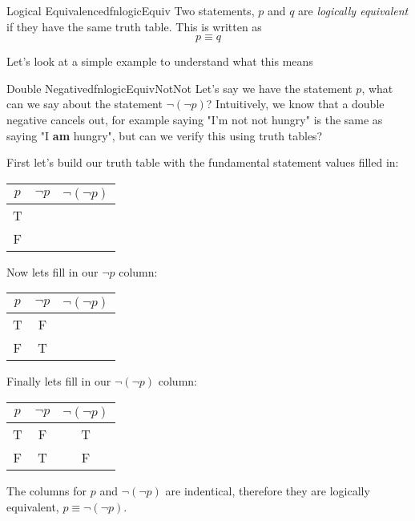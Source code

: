 \begin{dfn}[label={def:logicalEquivalence}]{Logical Equivalence}{dfnlogicEquiv}
    Two statements, $p$ and $q$ are \emph{logically equivalent} if they have the same truth table. This is written as $$ p \equiv q$$
\end{dfn}

Let's look at a simple example to understand what this means

\begin{exmpl}[label={exmpl:logicEquivNotNot}]{Double Negative}{dfnlogicEquivNotNot}
    Let's say we have the statement $p$, what can we say about the statement $\lnot (\lnot p)$? Intuitively, we know that a double negative cancels out, for example saying "I'm not not hungry" is the same as saying "I \textbf{am} hungry", but can we verify this using truth tables?

    First let's build our truth table with the fundamental statement values filled in:
    \begin{center}
        \begin{tabular}{|c|c|c|}
            \hline
            $p$ & $\lnot p$ & $\lnot (\lnot p)$ \\
            \hline
            T   &           &                   \\
            \hline
            F   &           &                   \\
            \hline
        \end{tabular}
    \end{center}
    \vspace{0.5cm}
    Now lets fill in our $\lnot p$ column:
    \begin{center}
        \begin{tabular}{|c|c|c|}
            \hline
            $p$ & $\lnot p$ & $\lnot (\lnot p)$ \\
            \hline
            T   & F         &                   \\
            \hline
            F   & T         &                   \\
            \hline
        \end{tabular}
    \end{center}
    \vspace{0.5cm}
    Finally lets fill in our $\lnot (\lnot p)$ column:
    \begin{center}
        \begin{tabular}{|c|c|c|}
            \hline
            $p$ & $\lnot p$ & $\lnot (\lnot p)$ \\
            \hline
            T   & F         & T                 \\
            \hline
            F   & T         & F                 \\
            \hline
        \end{tabular}
    \end{center}
    \vspace{0.5cm}
    The columns for $p$ and $\lnot(\lnot p)$ are indentical, therefore they are logically equivalent, $p \equiv \lnot(\lnot p)$.
\end{exmpl}

